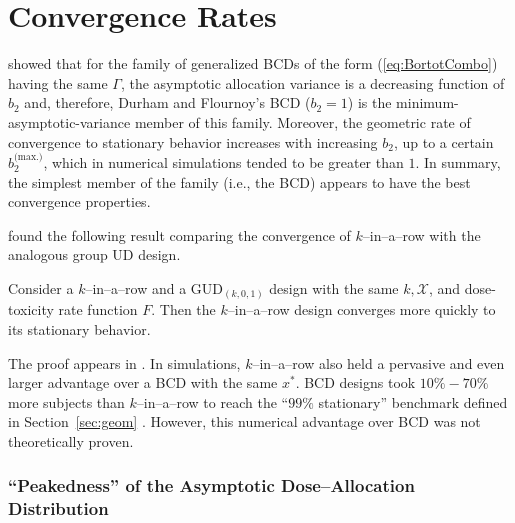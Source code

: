\section{Convergence Rates}

\cite{Bort:Giov:Upan:2005} showed that for the family of generalized BCDs of the form (\ref{eq:BortotCombo}) having the same $\Gamma$, the asymptotic allocation variance is a decreasing function of $b_2$ and, therefore, Durham and Flournoy's BCD ($b_2=1$) is the minimum-asymptotic-variance member of this family. Moreover, the geometric rate of convergence to stationary behavior increases with increasing $b_2$, up to a certain $b_2^\textrm{(max.)}$, which in numerical simulations tended to be greater than $1$. In summary, the simplest member of the family (i.e., the BCD) appears to have the best convergence properties.

\cite{Oron:Hoff:thek:2009} found the following result comparing the convergence of $k$--in--a--row with the analogous group UD design.
%
\begin{thm}\label{thm:krgudconv} Consider a $k$--in--a--row and a GUD$_{(k,0,1)}$ design with the same $k,\mathcal{X}$, and dose-toxicity rate function $F$. Then the $k$--in--a--row design converges more quickly to its stationary behavior.\end{thm}
%
\noindent The proof appears in \cite{Oron:Hoff:thek:2009}. In simulations, $k$--in--a--row also held a pervasive and even larger advantage over a BCD with the same $x^*$. BCD designs took $10\%-70\%$ more subjects than $k$--in--a--row to reach the ``$99\%$ stationary'' benchmark defined in Section~\ref{sec:geom} \citep{Oron:Hoff:thek:2009}. However, this numerical advantage over BCD was not theoretically proven.

\subsubsection{``Peakedness'' of the Asymptotic Dose--Allocation Distribution}


